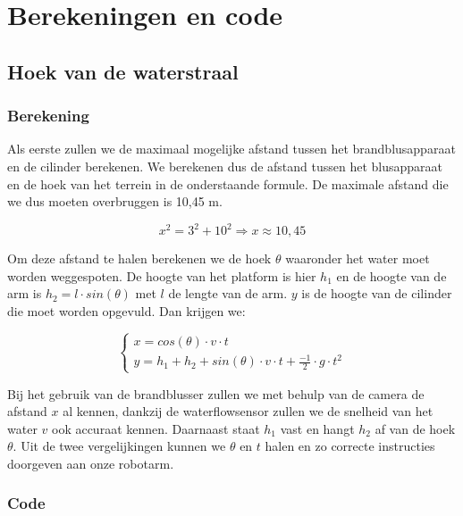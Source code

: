 \documentclass[kulak]{kulakarticle} %
\begin{document}
\section{Berekeningen en code}

	\subsection{Hoek van de waterstraal}
	
		\subsubsection{Berekening}
		
			Als eerste zullen we de maximaal mogelijke afstand tussen het brandblusapparaat en de cilinder berekenen. We berekenen dus de afstand tussen het blusapparaat en de hoek van het terrein in de onderstaande formule. De maximale afstand die we dus moeten overbruggen is 10,45 m.
		
				\begin{equation}
					x^2 = 3^2 + 10^2
					\Rightarrow x \approx 10,45 
				\end{equation}
				
			Om deze afstand te halen berekenen we de hoek $\theta$ waaronder het water moet worden weggespoten. De hoogte van het platform is hier \(h_1\) en de hoogte van de arm is \(h_2 = l \cdot sin(\theta)\) met \(l\) de lengte van de arm. \(y\) is de hoogte van de cilinder die moet worden opgevuld. Dan krijgen we:
			
				\begin{equation}
					\begin{cases}
						x  = cos(\theta) \cdot v \cdot t \\
						y = h_1 + h_2 + sin(\theta) \cdot v \cdot t + \frac{-1}{2} \cdot g \cdot t^2
					\end{cases}
				\end{equation}
				
			Bij het gebruik van de brandblusser zullen we met behulp van de camera de afstand \(x\) al kennen, dankzij de waterflowsensor zullen we de snelheid van het water \(v\) ook accuraat kennen.  Daarnaast staat \(h_1\) vast en hangt \(h_2\) af van de hoek \(\theta\). Uit de twee vergelijkingen kunnen we \(\theta\) en \(t\) halen en zo correcte instructies doorgeven aan onze robotarm.

		\subsubsection{Code}
		
\end{document}
